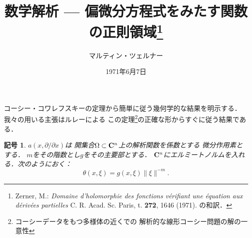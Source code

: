 \theoremstyle{mystyle}
\newtheorem{AXM}{公理}
\newtheorem{DFN}{定義}
\newtheorem{THM}{定理}
\newtheorem*{THM*}{定理}
\newtheorem{PRP}{命題}
\newtheorem{LMM}[Axiom]{補題}
\newtheorem{CRL}{系}
\newtheorem*{CRL*}{系}
\newtheorem{EG}[Axiom]{例}
\newtheorem{CNV}[Axiom]{規約}
\newtheorem{NTN}[Axiom]{記号}
\newtheorem*{NTN*}{記号}
\newtheorem{CMT}{コメント}
\newtheorem{RMK}{注意}
\newtheorem*{RMK*}{注意}






\def\inner<#1>{\langle #1 \rangle}








\title{数学解析 --- 偏微分方程式をみたす関数の正則領域\footnote{
    Zerner, M.: \textit{Domaine d'holomorphie des fonctions v\'erifiant une \'equation aux d\'eriv\'ees partielles}
    C. R. Acad. Sc. Paris, t. \textbf{272}, 1646 (1971). の和訳．
}}
\author{マルティン・ツェルナー}
\date{1971年6月7日}

\maketitle


コーシー・コワレフスキーの定理から簡単に従う幾何学的な結果を明示する．
我々の用いる主張はルレーによる
この定理\footnote{
    コーシーデータをもつ多様体の近くでの
    解析的な線形コーシー問題の解の一意性
}の正確な形からすぐに従う結果である．

\begin{NTN*}
    \(a(x,\partial/\partial x)\)は
    開集合\(\Omega\subset\mathbf{C}^n\)上の解析関数を係数とする
    微分作用素とする．
    \(m\)をその階数とし\(g\)をその主要部とする．
    \(\mathbf{C}^n\)にエルミートノルムを入れる．次のようにおく：
    \[
        \theta(x,\xi)=g(x,\xi)\lVert\xi\rVert^{-m}.
    \]
\end{NTN*}


